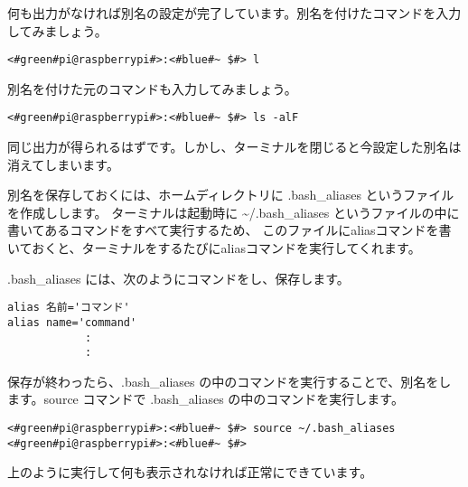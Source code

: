 何も出力がなければ別名の設定が完了しています。別名を付けたコマンドを入力してみましょう。

\begin{lstlisting}[caption=別名の確認, label=confirmAlias]
<#green#pi@raspberrypi#>:<#blue#~ $#> l
\end{lstlisting}

別名を付けた元のコマンドも入力してみましょう。

\begin{lstlisting}[caption=元のコマンドの確認, label=confirmCommand]
<#green#pi@raspberrypi#>:<#blue#~ $#> ls -alF
\end{lstlisting}

同じ出力が得られるはずです。しかし、ターミナルを閉じると今設定した別名は消えてしまいます。

別名を保存しておくには、ホームディレクトリに .bash{\_}aliases というファイルを作成しします。
ターミナルは起動時に \textasciitilde/.bash{\_}aliases というファイルの中に書いてあるコマンドをすべて実行するため、
このファイルにaliasコマンドを書いておくと、ターミナルをするたびにaliasコマンドを実行してくれます。

.bash{\_}aliases には、次のようにコマンドをし、保存します。
\begin{lstlisting}[caption=\textasciitilde/.bash\_aliasesの書き方1, label=bashAliasesGrammar1]
alias 名前='コマンド'
alias name='command'
            :
            :
\end{lstlisting}

保存が終わったら、.bash{\_}aliases の中のコマンドを実行することで、別名をします。source コマンドで .bash{\_}aliases の中のコマンドを実行します。
\begin{lstlisting}[caption=\textasciitilde/.bash\_aliasesの読込, label=sourceBashAliases]
<#green#pi@raspberrypi#>:<#blue#~ $#> source ~/.bash_aliases
<#green#pi@raspberrypi#>:<#blue#~ $#>
\end{lstlisting}

上のように実行して何も表示されなければ正常にできています。


